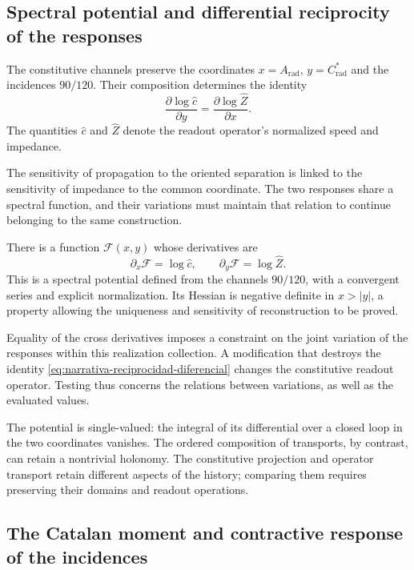 \subsection{Spectral potential and differential reciprocity of the responses}
\label{subsec:narrativa-potencial-espectral}

The constitutive channels preserve the coordinates
$x=A_{\mathrm{rad}}$, $y=C^*_{\mathrm{rad}}$ and the incidences $90/120$.
Their composition determines the identity
\begin{equation}
 \boxed{
 \frac{\partial\log\widehat c}{\partial y}
 =\frac{\partial\log\widehat Z}{\partial x}.}
 \label{eq:narrativa-reciprocidad-diferencial}
\end{equation}
The quantities $\widehat c$ and $\widehat Z$ denote the readout operator's
normalized speed and impedance.

The sensitivity of propagation to the oriented separation is
linked to the sensitivity of impedance to the common coordinate.
The two responses share a spectral function, and their variations
must maintain that relation to continue belonging to the same
construction.

There is a function $\mathscr F(x,y)$ whose derivatives are
\begin{equation}
 \partial_x\mathscr F=\log\widehat c,
 \qquad
 \partial_y\mathscr F=\log\widehat Z.
 \label{eq:narrativa-gradiente-potencial}
\end{equation}
This is a spectral potential defined from the channels $90/120$,
with a convergent series and explicit normalization. Its Hessian is
negative definite in $x>|y|$, a property allowing the uniqueness
and sensitivity of reconstruction to be proved.

Equality of the cross derivatives imposes a constraint
on the joint variation of the responses within this realization
collection. A modification that destroys the identity
\eqref{eq:narrativa-reciprocidad-diferencial} changes the constitutive
readout operator. Testing thus concerns the relations between variations,
as well as the evaluated values.

The potential is single-valued: the integral of its differential over
a closed loop in the two coordinates vanishes. The ordered
composition of transports, by contrast, can retain a nontrivial
holonomy. The constitutive projection and operator transport
retain different aspects of the history; comparing them requires
preserving their domains and readout operations.

\subsection{The Catalan moment and contractive response of the incidences}
\label{subsec:narrativa-catalan-potencial}

